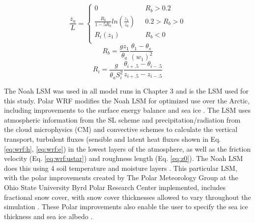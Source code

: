 \begin{equation}\label{eq:wrf:zal}
\frac{z_{a}}{L} = \begin{cases} 
0 & \text{    } R_{b} > 0.2 \\ 
\frac{R_{b}}{1-5R_{b}}ln(\frac{z_{1}}{z_{0}}) & \text{    } 0.2 > R_{b} > 0 \\ 
R_{i} ( z_{1} ) & \text{    }R_{b} < 0  \\ 
\end{cases}
\end{equation}
\begin{equation}\label{eq:wrf:rb}
R_{b} = \frac{gz_{1}}{\theta_{a}}\frac{\theta_{1} - \theta_{s}}{(w_{1})^{2}}
\end{equation}
\begin{equation}\label{eq:wrf:ri}
R_{i} = \frac{g}{\theta_{a}S_{i}^{2}} \frac{\theta_{i+.5} - \theta_{i-.5}}{z_{i+.5} - z_{i-.5}}
\end{equation}

The Noah LSM \citep{chen:2001} was used in all model runs in Chapter 3 and is the LSM used for this study. Polar WRF modifies the Noah LSM for optimized use over the Arctic, including improvements to the surface energy balance and sea ice \citep{hines:2015, bromwich:2009}. The LSM uses atmospheric information from the SL scheme and precipitation/radiation from the cloud microphysics (CM) and convective schemes to calculate the vertical transport, turbulent fluxes (sensible and latent heat fluxes shown in Eq. \ref{eq:wrf:h}, \ref{eq:wrf:e}) in the lowest layers of the atmosphere, as well as the friction velocity (Eq. \ref{eq:wrf:ustar}) and roughness length (Eq. \ref{eq:z0}). The Noah LSM does this using 4 soil temperature and moisture layers \citep{dudhia:2014, skamarock:2019}. This particular LSM, with the polar improvements created by The Polar Meteorology Group at the Ohio State University Byrd Polar Research Center implemented, includes fractional snow cover, with snow cover thicknesses allowed to vary throughout the simulation \cite{chen:2001}. These Polar improvements also enable the user to specify the sea ice thickness and sea ice albedo \citep{hines:2015}.

